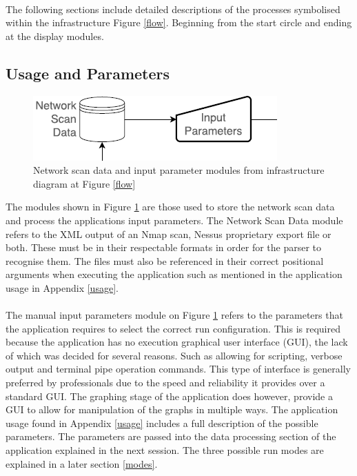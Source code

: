 \paragraph{}The following sections include detailed descriptions of the processes symbolised within the infrastructure Figure \ref{flow}.  Beginning from the start circle and ending at the display modules.\linebreak

\subsection{Usage and Parameters}
\label{infra1}

\begin{figure}[!h]
\centering
\includegraphics{./Figures/infra1.png}
\caption{Network scan data and input parameter modules from infrastructure diagram at Figure \ref{flow}}
\label{infra1}
\end{figure}
The modules shown in Figure \ref{infra1} are those used to store the network scan data and process the applications input parameters. The Network Scan Data module refers to the XML output of an Nmap scan, Nessus proprietary export file or both. These must be in their respectable formats in order for the parser to recognise them. The files must also be referenced in their correct positional arguments when executing the application such as mentioned in the application usage in Appendix \ref{usage}.

\paragraph{}The  manual input parameters module on Figure \ref{infra1} refers to the parameters that the application requires to select the correct run configuration. This is required because the application has no execution graphical user interface (GUI), the lack of which was decided for several reasons. Such as allowing for scripting, verbose output and terminal pipe operation commands. This type of interface is generally preferred by professionals due to the speed and reliability it provides over a standard GUI. The graphing stage of the application does however, provide a GUI to allow for manipulation of the graphs in multiple ways. The application usage found in Appendix \ref{usage} includes a full description of the possible parameters. The parameters are passed into the data processing section of the application explained in the next session. The three possible run modes are explained in a later section \ref{modes}.

